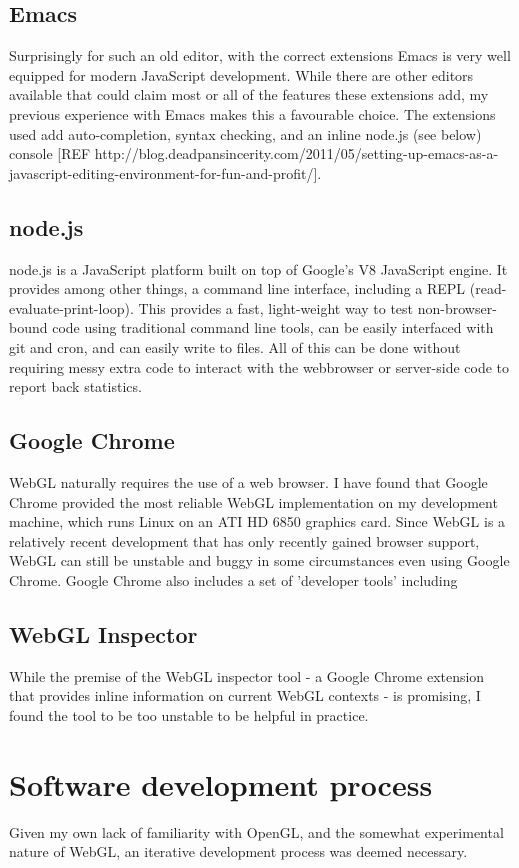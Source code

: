 \documentclass[12pt,twoside,notitlepage]{report}
\begin{document}
\subsection*{Emacs}
Surprisingly for such an old editor, with the correct extensions Emacs is very well equipped for modern JavaScript development. While there are other editors available that could claim most or all of the features these extensions add, my previous experience with Emacs makes this a favourable choice. The extensions used add auto-completion, syntax checking, and an inline node.js (see below) console [REF http://blog.deadpansincerity.com/2011/05/setting-up-emacs-as-a-javascript-editing-environment-for-fun-and-profit/].

\subsection*{node.js}
node.js is a JavaScript platform built on top of Google's V8 JavaScript engine. It provides among other things, a command line interface, including a REPL (read-evaluate-print-loop). This provides a fast, light-weight way to test non-browser-bound code using traditional command line tools, can be easily interfaced with git and cron, and can easily write to files. All of this can be done without requiring messy extra code to interact with the webbrowser or server-side code to report back statistics.

\subsection*{Google Chrome}
WebGL naturally requires the use of a web browser. I have found that Google Chrome provided the most reliable WebGL implementation on my development machine, which runs Linux on an ATI HD 6850 graphics card. Since WebGL is a relatively recent development that has only recently gained browser support, WebGL can still be unstable and buggy in some circumstances even using Google Chrome. Google Chrome also includes a set of 'developer tools' including 

\subsection*{WebGL Inspector}
While the premise of the WebGL inspector tool - a Google Chrome extension that provides inline information on current WebGL contexts - is promising, I found the tool to be too unstable to be helpful in practice.

\section{Software development process}
Given my own lack of familiarity with OpenGL, and the somewhat experimental nature of WebGL, an iterative development process was deemed necessary.
\end{document}
